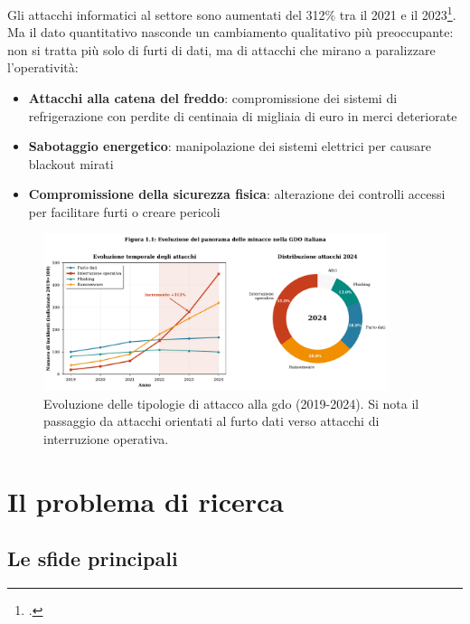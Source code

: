 Gli attacchi informatici al settore sono aumentati del 312\% tra il 2021 e il 2023\footcite{enisa2024retail}. Ma il dato quantitativo nasconde un cambiamento qualitativo più preoccupante: non si tratta più solo di furti di dati, ma di attacchi che mirano a paralizzare l'operatività:

\begin{itemize}
\item \textbf{Attacchi alla catena del freddo}: compromissione dei sistemi di refrigerazione con perdite di centinaia di migliaia di euro in merci deteriorate
\item \textbf{Sabotaggio energetico}: manipolazione dei sistemi elettrici per causare blackout mirati
\item \textbf{Compromissione della sicurezza fisica}: alterazione dei controlli accessi per facilitare furti o creare pericoli
\end{itemize}

\begin{figure}[htbp]
\centering
\includegraphics[width=0.9\textwidth]{thesis_figures/cap1/fig_1_1_attack_evolution.pdf}
\caption{Evoluzione delle tipologie di attacco alla \gls{gdo} (2019-2024). Si nota il passaggio da attacchi orientati al furto dati verso attacchi di interruzione operativa.}
\label{fig:attack_evolution}
\end{figure}

\section{\texorpdfstring{Il problema di ricerca}{1.2 - Il problema di ricerca}}
\label{sec:problema_ricerca}

\subsection{\texorpdfstring{Le sfide principali}{1.2.1 - Le sfide principali}}
\label{subsec:sfide_principali}

